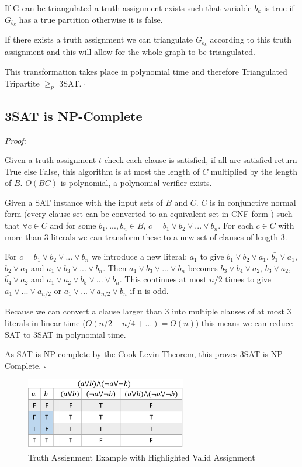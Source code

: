 \documentclass[a4paper,11pt]{report}
\begin{document}
If G can be triangulated a truth assignment exists such that variable $b_k$ is true if $G_{b_k}$ has a true partition otherwise it is false.

If there exists a truth assignment we can triangulate $G_{b_k}$ according to this truth assignment and this will allow for the whole graph to be triangulated.

This transformation takes place in polynomial time and therefore Triangulated Tripartite $\geq_p$ 3SAT. $\square$

\subsection{3SAT is NP-Complete}

\textit{Proof:}

Given a truth assignment $t$ check each clause is satisfied, if all are satisfied return True else False, this algorithm is at most the length of $C$ multiplied by the length of $B$. $O(BC)$ is polynomial, a polynomial verifier exists.

Given a SAT instance with the input sets of $B$ and $C$. $C$ is in conjunctive normal form (every clause set can be converted to an equivalent set in CNF form ) such that $\forall c \in C$ and for some $b_1, ... ,b_n \in B$, $c = b_1 \lor b_2
\lor ... \lor b_n$. For each $c \in C$ with more than 3 literals we can transform these to a new set of clauses of length 3.

For $c = b_1 \lor b_2 \lor ... \lor b_n$ we introduce a new literal: $a_1$ to give $b_1 \lor b_2 \lor a_1$, $\bar{b_1} \lor a_1$, $\bar{b_2} \lor a_1$ and $a_1 \lor b_3 \lor ... \lor b_n$. Then $a_1 \lor b_3 \lor ... \lor b_n$ becomes $b_3 \lor b_4 \lor a_2$, $\bar{b_3} \lor a_2$, $\bar{b_4} \lor a_2$ and $a_1 \lor a_2 \lor b_5 \lor ... \lor b_n$. This continues at most $n/2$ times to give $a_1 \lor ... \lor a_{n/2}$ or $a_1 \lor ... \lor a_{n/2} \lor b_n$ if n is odd.

Because we can convert a clause larger than 3 into multiple clauses of at most 3 literals in linear time ($O(n/2 + n/4 + ...) = O(n)$) this means we can reduce SAT to 3SAT in polynomial time.

As SAT is NP-complete by the Cook-Levin Theorem, this proves 3SAT is NP-Complete. $\square$
		
\begin{figure}
\begin{center}
		\includegraphics[width=70mm]{figures/sat_example.png}
\end{center}
		\caption{Truth Assignment Example with Highlighted Valid Assignment}
\end{figure}
\end{document}
